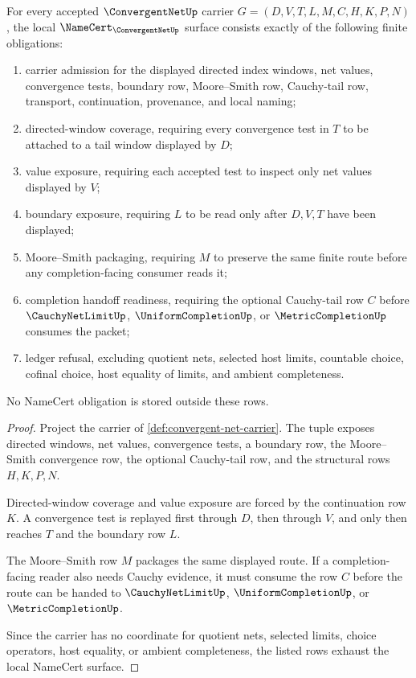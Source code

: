 \begin{theorem}
\label{thm:convergent-net-namecert-obligations}
For every accepted $\ConvergentNetUp$ carrier $G=(D,V,T,L,M,C,H,K,P,N)$, the local $\NameCert_{\ConvergentNetUp}$ surface consists exactly of the following finite obligations:
\begin{enumerate}
\item carrier admission for the displayed directed index windows, net values, convergence tests, boundary row, Moore--Smith row, Cauchy-tail row, transport, continuation, provenance, and local naming;
\item directed-window coverage, requiring every convergence test in $T$ to be attached to a tail window displayed by $D$;
\item value exposure, requiring each accepted test to inspect only net values displayed by $V$;
\item boundary exposure, requiring $L$ to be read only after $D,V,T$ have been displayed;
\item Moore--Smith packaging, requiring $M$ to preserve the same finite route before any completion-facing consumer reads it;
\item completion handoff readiness, requiring the optional Cauchy-tail row $C$ before $\CauchyNetLimitUp$, $\UniformCompletionUp$, or $\MetricCompletionUp$ consumes the packet;
\item ledger refusal, excluding quotient nets, selected host limits, countable choice, cofinal choice, host equality of limits, and ambient completeness.
\end{enumerate}
No NameCert obligation is stored outside these rows.
\end{theorem}
\begin{proof}
Project the carrier of \autoref{def:convergent-net-carrier}. The tuple exposes directed windows, net values, convergence tests, a boundary row, the Moore--Smith convergence row, the optional Cauchy-tail row, and the structural rows $H,K,P,N$.

Directed-window coverage and value exposure are forced by the continuation row $K$. A convergence test is replayed first through $D$, then through $V$, and only then reaches $T$ and the boundary row $L$.

The Moore--Smith row $M$ packages the same displayed route. If a completion-facing reader also needs Cauchy evidence, it must consume the row $C$ before the route can be handed to $\CauchyNetLimitUp$, $\UniformCompletionUp$, or $\MetricCompletionUp$.

Since the carrier has no coordinate for quotient nets, selected limits, choice operators, host equality, or ambient completeness, the listed rows exhaust the local NameCert surface.
\end{proof}

